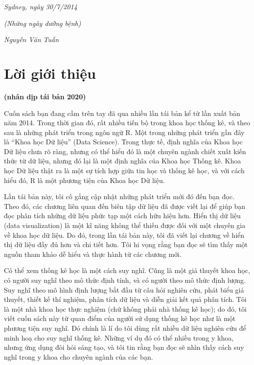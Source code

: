 \documentclass[
]{book}
\begin{document}
\emph{Sydney, ngày 30/7/2014}

\emph{(Những ngày dưỡng bệnh)}

\emph{Nguyễn Văn Tuấn}

\hypertarget{lux1eddi-giux1edbi-thiux1ec7u}{%
\chapter*{Lời giới thiệu}\label{lux1eddi-giux1edbi-thiux1ec7u}}

\textbf{(nhân dịp tái bản 2020)}

Cuốn sách bạn đang cầm trên tay đã qua nhiều lần tái bản kể từ lần xuất bản năm 2014. Trong thời gian đó, rất nhiều tiến bộ trong khoa học thống kê, và theo sau là những phát triển trong ngôn ngữ R. Một trong những phát triển gần đây là ``Khoa học Dữ liệu'' (Data Science). Trong thực tế, định nghĩa của Khoa học Dữ liệu chưa rõ ràng, nhưng có thể hiểu đó là một chuyên ngành chiết xuất kiến thức từ dữ liệu, nhưng đó lại là một định nghĩa của Khoa học Thống kê. Khoa học Dữ liệu thật ra là một sự tích hợp giữa tin học và thống kê học, và với cách hiểu đó, R là một phương tiện của Khoa học Dữ liệu.

Lần tái bản này, tôi cố gắng cập nhật những phát triển mới đó đến bạn đọc. Theo đó, các chương liên quan đến biên tập dữ liệu đã được viết lại để giúp bạn đọc phân tích những dữ liệu phức tạp một cách hữu hiệu hơn. Hiển thị dữ liệu (data visualization) là một kĩ năng không thể thiếu được đối với một chuyên gia về khoa học dữ liệu. Do đó, trong lần tái bản này, tôi đã viết lại chương về hiển thị dữ liệu đầy đủ hơn và chi tiết hơn. Tôi hi vọng rằng bạn đọc sẽ tìm thấy một nguồn tham khảo dễ hiểu và thực hành từ các chương mới.

Có thể xem thống kê học là một cách suy nghĩ. Cũng là một giả thuyết khoa học, có người suy nghĩ theo mô thức định tính, và có người theo mô thức định lượng. Suy nghĩ theo mô hình định lượng bắt đầu từ câu hỏi nghiên cứu, phát biểu giả thuyết, thiết kế thí nghiệm, phân tích dữ liệu và diễn giải kết quả phân tích. Tôi là một nhà khoa học thực nghiệm (chứ không phải nhà thống kê học); do đó, tôi viết cuốn sách này từ quan điểm của người sử dụng thống kê học như là một phương tiện suy nghĩ. Đó chính là lí do tôi dùng rất nhiều dữ liệu nghiên cứu để minh hoạ cho suy nghĩ thống kê. Những ví dụ đó có thể nhiều trong y khoa, nhưng ứng dụng đòi hỏi sáng tạo, và tôi tin rằng bạn đọc sẽ nhìn thấy cách suy nghĩ trong y khoa cho chuyên ngành của các bạn.
\end{document}
